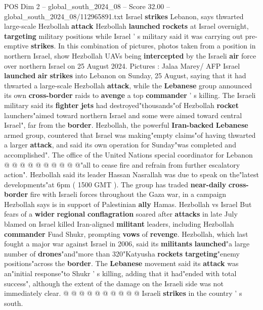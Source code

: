 \begin{textsample}{POS Dim 2 – global\_south\_2024\_08 – Score 32.00 – global\_south\_2024\_08/112965891.txt}  \label{ex:f2_pos_009}
Israel \textbf{strikes} Lebanon, says thwarted large-scale Hezbollah \textbf{attack} Hezbollah \textbf{launched} \textbf{rockets} at Israel overnight, \textbf{targeting} military positions while Israel ' s military said it was carrying out pre-emptive \textbf{strikes}.
In this combination of pictures, photos taken from a position in northern Israel, show Hezbollah UAVs being \textbf{intercepted} by the Israeli \textbf{air} force over northern Israel on 25 August 2024.
Pictures : Jalaa Marey/ AFP Israel \textbf{launched} \textbf{air} \textbf{strikes} into Lebanon on Sunday, 25 August, saying that it had thwarted a large-scale Hezbollah \textbf{attack}, while the \textbf{Lebanese} group announced its own \textbf{cross-border} raids to \textbf{avenge} a top \textbf{commander} ' s killing.
The Israeli military said its \textbf{fighter} \textbf{jets} had destroyed"thousands"of Hezbollah \textbf{rocket} launchers"aimed toward northern Israel and some were aimed toward central Israel", far from the \textbf{border}.
Hezbollah, the powerful \textbf{Iran-backed} \textbf{Lebanese} armed group, countered that Israel was making"empty claims"of having thwarted a larger \textbf{attack}, and said its own operation for Sunday"was completed and accomplished".
The office of the United Nations special coordinator for Lebanon @ @ @ @ @ @ @ @ @ @"all to cease fire and refrain from further escalatory action".
Hezbollah said its leader Hassan Nasrallah was due to speak on the"latest developments"at 6pm ( 1500 GMT ).
The group has traded \textbf{near-daily} \textbf{cross-border} fire with Israeli forces throughout the Gaza war, in a campaign Hezbollah says is in support of Palestinian \textbf{ally} Hamas.
Hezbollah vs Israel But fears of a \textbf{wider} \textbf{regional} \textbf{conflagration} soared after \textbf{attacks} in late July blamed on Israel killed Iran-aligned \textbf{militant} leaders, including Hezbollah \textbf{commander} Fuad Shukr, prompting \textbf{vows} of \textbf{revenge}.
Hezbollah, which last fought a major war against Israel in 2006, said its \textbf{militants} \textbf{launched}"a large number of \textbf{drones}"and"more than 320"Katyusha \textbf{rockets} \textbf{targeting}"enemy positions"across the \textbf{border}.
The \textbf{Lebanese} movement said its \textbf{attack} was an"initial response"to Shukr ' s killing, adding that it had"ended with total success", although the extent of the damage on the Israeli side was not immediately clear. @ @ @ @ @ @ @ @ @ @ Israeli \textbf{strikes} in the country ' s south.

\end{textsample}
